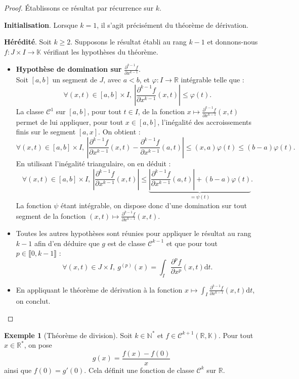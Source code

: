 \documentclass[french]{article}
\newcommand{\N}{\mathbb{N}}
\newcommand{\R}{\mathbb{R}}
\newcommand{\K}{\mathbb{K}}
\newcommand{\st}{^*}
\renewcommand{\d}{\text{d}}
\theoremstyle{plain}
\theoremstyle{definition}
\newtheorem*{ex}{Exemple}
\theoremstyle{remark}
\begin{document}
\begin{proof}
	Établissons ce résultat par récurrence sur $k$.
	
	\textbf{Initialisation}. Lorsque $k=1$, il s'agit précisément du théorème de dérivation.
	
	\textbf{Hérédité}. Soit $k\geqslant 2$. Supposons le résultat établi au rang $k-1$ et donnons-nous $f:J\times I\to\K$ vérifiant les hypothèses du théorème.
	\begin{itemize}
		\item \textbf{Hypothèse de domination sur} $\displaystyle\frac{\partial^{k-1}f}{\partial x^{k-1}}$. \\
		Soit $[a,b]$ un segment de $J$, avec $a<b$, et $\varphi:I\to\R$ intégrable telle que :
		$$\forall (x,t)\in [a,b]\times I,\ \left\lvert\frac{\partial^{k-1} f}{\partial x^{k-1}}(x,t)\right\rvert\leqslant\varphi(t).$$
		La classe $\mathcal{C}^1$ sur $[a,b]$, pour tout $t\in I$, de la fonction $x\mapsto\displaystyle\frac{\partial^{k-1}f}{\partial x^{k-1}}(x,t)$ permet de lui appliquer, pour tout $x\in[a,b]$, l'inégalité des accroissements finis sur le segment $[a,x]$. On obtient :
		$$\forall (x,t)\in[a,b]\times I,\ \left\lvert\frac{\partial^{k-1}f}{\partial x^{k-1}}(x,t)-\frac{\partial^{k-1}f}{\partial x^{k-1}}(a,t)\right\rvert\leqslant (x,a)\varphi(t)\leqslant(b-a)\varphi(t).$$
		En utilisant l'inégalité triangulaire, on en déduit :
		$$\forall (x,t)\in[a,b]\times I,\ \left\lvert\frac{\partial^{k-1}f}{\partial x^{k-1}}(x,t)\right\rvert\leqslant\underbrace{\left\lvert\frac{\partial^{k-1}f}{\partial x^{k-1}}(a,t)\right\rvert+(b-a)\varphi(t)}_{=\psi(t)}.$$
		La fonction $\psi$ étant intégrable, on dispose donc d'une domination sur tout segment de la fonction $(x,t)\mapsto\displaystyle\frac{\partial^{k-1}f}{\partial x^{k-1}}(x,t)$.
		\item Toutes les autres hypothèses sont réunies pour appliquer le résultat au rang $k-1$ afin d'en déduire que $g$ est de classe $\mathcal{C}^{k-1}$ et que pour tout $p\in\llbracket0,k-1\rrbracket$ :
		$$\forall (x,t)\in J\times I,\ g^{(p)}(x)=\int_I\frac{\partial^p f}{\partial x^p}(x,t)\d t.$$
		\item En appliquant le théorème de dérivation à la fonction $x\mapsto\displaystyle\int_I\frac{\partial^{k-1}f}{\partial x^{k-1}}(x,t)\d t$, on conclut.
	\end{itemize}
\end{proof}

\begin{ex}[Théorème de division]
	Soit $k\in\N\st$ et $f\in\mathcal{C}^{k+1}(\R,\K)$. Pour tout $x\in\R\st$, on pose $$g(x)=\frac{f(x)-f(0)}{x}$$ ainsi que $f(0)=g'(0)$. Cela définit une fonction de classe $\mathcal{C}^k$ sur $\R$.
\end{ex}
\end{document}
